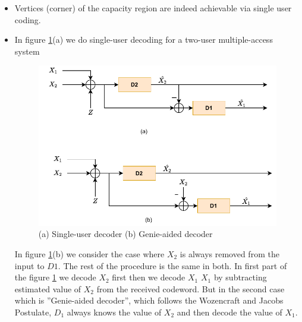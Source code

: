 \documentclass{article}
\begin{document}
\begin{itemize}
	\item Vertices (corner) of the capacity region are indeed achievable via single user coding.
\item In figure \ref{fig3}(a) we do single-user decoding  for a two-user multiple-access system

\begin{center}
	\begin{figure}[htb!]
		\centering
		\includegraphics[height=.35\textheight]{pic_3.pdf}		
		\caption{(a) Single-user decoder (b) Genie-aided decoder}
		\label{fig3}
	\end{figure}
\end{center}
 In figure \ref{fig3}(b) we consider the case where $X_2$ is always removed from the input to $D1$. The rest of the procedure is the same in both. In first part of the figure \ref{fig3} we  decode $X_2$ first then we decode $X_1$ $X_1$ by subtracting estimated value of $X_2$ from the received codeword. But in the second case which is ''Genie-aided decoder'', which follows the Wozencraft and Jacobs Postulate\cite{1}, $D_1$ always knows the value of $X_2$ and then decode the value of  $X_1$.
\end{itemize}
\end{document}
